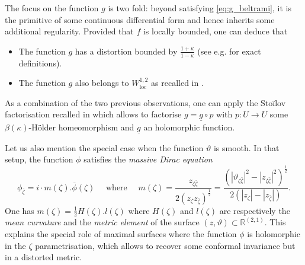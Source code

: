 \documentclass[reqno]{amsart}
\numberwithin{equation}{section}
\theoremstyle{definition}
\theoremstyle{remark}
\begin{document}
The focus on the function $g$ is two fold: beyond satisfying \eqref{eq:g_beltrami}, it is the primitive of some continuous differential form and hence inherits some additional regularity. Provided that $f$ is locally bounded, one can deduce that
\begin{itemize}
\item The function $g$ has a distortion bounded by $\frac{1+\kappa}{1-\kappa}$ (see e.g. \cite[Equation (2.27)]{AIM} for exact definitions).
\item The function $g$ also belongs to $ W^{1,2}_{\textrm{loc}}$ as recalled in \cite[Section 2.5]{Mah23}.
\end{itemize}
As a combination of the two previous observations, one can apply the Stoïlov factorisation recalled in \cite[Corollary $5.3.3$]{AIM} which allows to factorise $g= \underline{g} \circ p $ with $p:U \rightarrow U$ some $\beta(\kappa)$-Hölder homeomorphism and $\underline{g}$ an holomorphic function. 

Let us also mention the special case when the function $\vartheta$ is smooth. In that setup, the function $\phi $ satisfies the \emph{massive Dirac equation} \cite[Section 2.7]{Che20}
\begin{equation}\label{eq:massive-phi}
	\phi_{\bar{\zeta}}=i\cdot m(\zeta).\overline{\phi}(\zeta) \quad \textrm{ where } \quad m(\zeta)=\frac{z_{\zeta \bar{\zeta}}}{2(z_\zeta z_{\bar{\zeta}})^\frac{1}{2}}= \frac{(|\vartheta_{\zeta \bar{\zeta}} |^2-|z_{\zeta \bar{\zeta}}|^2)^{\frac12}}{2(|z_\zeta|-|z_{\bar{\zeta}}|)}.
\end{equation}
One has $m(\zeta)=\frac{1}{2}H(\zeta).l(\zeta) $ where $H(\zeta)$ and $l(\zeta)$ are respectively the \emph{mean curvature} and the \emph{metric element} of the surface $(z,\vartheta)\subset \mathbb{R}^{(2,1)}$. This explains the special role of maximal surfaces where the function $\phi$ is holomorphic in the $\zeta$ parametrisation, which allows to recover some conformal invariance but in a distorted metric.
\end{document}
